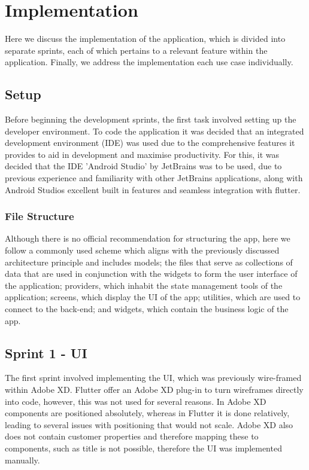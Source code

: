 \documentclass[12pt]{article}
\begin{document}
	\section{Implementation}
	Here we discuss the implementation of the application, which is divided into separate sprints, each of which pertains to a relevant feature within the application. Finally, we address the implementation each use case individually.
	
	\label{chap:implementation}
	\subsection{Setup}
	Before beginning the development sprints, the first task involved setting up the developer environment. To code the application it was decided that an integrated development environment (IDE) was used due to the comprehensive features it provides to aid in development and maximise productivity. For this, it was decided that the IDE 'Android Studio' by JetBrains \cite{DownloadAndroidStudio} was to be used, due to previous experience and familiarity with other JetBrains applications, along with Android Studios excellent built in features and seamless integration with flutter. 


	\subsubsection{File Structure}
	Although there is no official recommendation for structuring the app, here we follow a commonly used scheme which aligns with the previously discussed architecture principle and includes models; the files that serve as collections of data that are used in conjunction with the widgets to form the user interface of the application; providers, which inhabit the state management tools of the application; screens, which display the UI of the app; utilities, which are used to connect to the back-end; and widgets, which contain the business logic of the app.
	
	
	
	\subsection{Sprint 1 - UI}
	The first sprint involved implementing the UI, which was previously wire-framed within Adobe XD. Flutter offer an Adobe XD plug-in to turn wireframes directly into code, however, this was not used for several reasons. In Adobe XD components are positioned absolutely, whereas in Flutter it is done relatively, leading to several issues with positioning that would not scale. Adobe XD also does not contain customer properties and therefore mapping these to components, such as title is not possible, therefore the UI was implemented manually.
	
\end{document}
